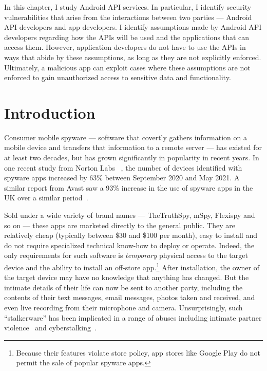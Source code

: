 In this chapter, I study Android API services. In particular, I identify security vulnerabilities that arise from the interactions between two parties --- Android API developers and app developers. I identify assumptions made by Android API developers regarding how the APIs will be used and the applications that can access them. However, application developers do not have to use the APIs in ways that abide by these assumptions, as long as they are not explicitly enforced. Ultimately, a malicious app can exploit cases where these assumptions are not enforced to gain unauthorized access to sensitive data and functionality.

\section{Introduction}

Consumer mobile spyware --- software that covertly gathers information
on a mobile device and transfers that information to a remote server
--- has existed for at least two decades, but has grown significantly
in popularity in recent years.  In one recent study from Norton Labs
~\cite{AYearAft87:online}, the number of devices identified with
spyware apps increased by 63\% between September 2020 and May 2021. A
similar report from Avast saw a 93\% increase in the use of spyware
apps in the UK over a similar period~\cite{UseofSta91:online}.

Sold under a wide variety of brand names --- TheTruthSpy, mSpy,
Flexispy and so on --- these apps are marketed directly to the general
public.  They are relatively cheap (typically between \$30 and \$100
per month), easy to install and do not require specialized technical
know-how to deploy or operate.  Indeed, the only requirements for such
software is \emph{temporary} physical access to the target device
and the ability to install an off-store app.\footnote{Because their features
  violate store policy, app stores like Google Play do not permit the sale of popular spyware apps.}  After
installation, the owner of the target device may have no knowledge
that anything has changed.  But the intimate details of their life can
now be sent to another party, including the contents of their text
messages, email messages, photos taken and received, and even live
recording from their microphone and camera.  Unsurprisingly, such
``stalkerware'' has been implicated in a range of abuses including
intimate partner violence~\cite{chatterjee2018spyware} and
cyberstalking~\cite{woodlock2017abuse}.

